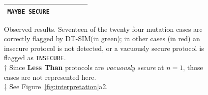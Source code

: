 \documentclass[acmlarge, manuscript, screen, review, anonymous, table]{acmart}
\newcommand{\highlight}[2]{\colorbox{#1}{#2}}
\newcommand{\toolname}{\textsc{DT-SIM}\xspace}
\begin{document}
\begin{figure}
\begin{tabular}{| r r | c : c : c : c|}
\begin{minipage}[t][][c]{0.204\textwidth}
          \texttt{MAYBE SECURE}
        \end{minipage}
      \\
    \hline
  \end{tabular}
  \bigskip
  \caption{Observed results.
  Seventeen of the twenty four mutation cases are correctly flagged by \toolname (\highlight{correct}{in green});
  in other cases (\highlight{incorrect}{in red}) an insecure protocol is not detected, or a vacuously secure protocol is flagged as \texttt{INSECURE}.\\
  \footnotesize{$\dagger$ Since \textbf{Less Than} protocols are \emph{vacuously secure} at $n=1$, those cases are not represented here.}\\
  \footnotesize{$\ddagger$ See Figure~\ref{fig:interpretation}a2.}}
  \label{fig:observations}
\end{figure}
\end{document}
